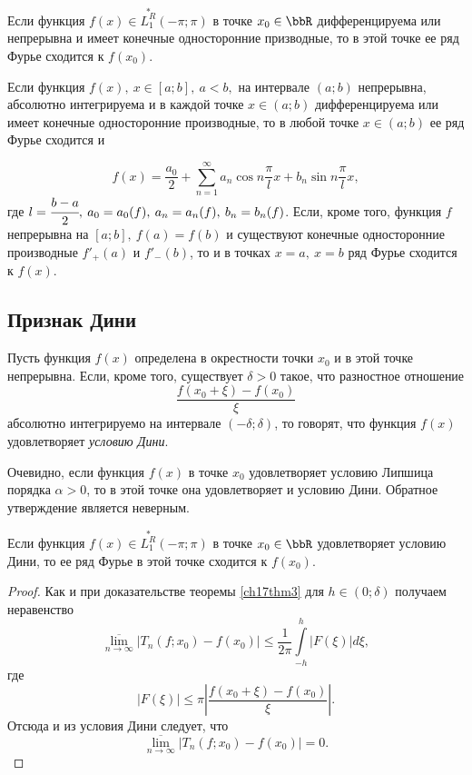 \begin{cons}
Если функция $f(x) \in \overset{*}{L^{R}_1}(-\pi;\pi)$ в точке $x_0 \in \bbR$ дифференцируема или непрерывна и имеет конечные односторонние призводные, то в этой точке ее ряд Фурье сходится к $f(x_0)$.
\end{cons}

\begin{cons}
Если функция $f(x), \: x \in [a;b], \: a < b,$ на интервале $(a;b)$ непрерывна, абсолютно интегрируема и в каждой точке $x \in (a;b)$ дифференцируема или имеет конечные односторонние производные, то в любой точке $x \in (a;b)$ ее ряд Фурье сходится и 

$$
f(x) = \frac{a_0}{2} + \sum\limits_{n = 1}^{\infty} a_n \cos{n \frac{\pi}{l} x} + b_n \sin{n \frac{\pi}{l} x},
$$
где $l = \cfrac{b - a}{2}, \: a_0 = a_0(f), \: a_n = a_n(f), \: b_n = b_n(f)$. Если, кроме того, функция $f$ непрерывна на $[a;b], \: f(a) = f(b)$ и существуют конечные односторонние производные $f'_+(a)$ и $f'_-(b)$, то и в точках $x = a, \: x = b$ ряд Фурье сходится к $f(x)$.
\end{cons}


\subsection{Признак Дини}
Пусть функция $f(x)$ определена в окрестности точки $x_0$ и в этой точке непрерывна. Если, кроме того, существует $\delta > 0$ такое, что разностное отношение
$$
\frac{f(x_0 + \xi) - f(x_0)}{\xi}
$$
абсолютно интегрируемо на интервале $(-\delta;\delta)$, то говорят, что функция $f(x)$ удовлетворяет \textit{условию Дини}.

Очевидно, если функция $f(x)$ в точке $x_0$ удовлетворяет условию Липшица порядка $\alpha > 0$, то в этой точке она удовлетворяет и условию Дини. Обратное утверждение является неверным.

\begin{thm}  \label{ch17thm4}
Если функция $f(x) \in \overset{*}{L^{R}_1}(-\pi;\pi)$ в точке $x_0 \in \bbR$ удовлетворяет условию Дини, то ее ряд Фурье в этой точке сходится к $f(x_0)$.
\end{thm}
\begin{proof}
Как и при доказательстве теоремы \ref{ch17thm3} для $h \in (0;\delta)$ получаем неравенство
$$
\overline{\lim\limits_{n \to \infty}}|T_n(f; x_0) - f(x_0)| \le \frac{1}{2\pi}\int\limits_{-h}^{h}|F(\xi)|d\xi,
$$
где
$$
|F(\xi)| \le \pi\left|\frac{f(x_0 + \xi) - f(x_0)}{\xi}\right|.
$$
Отсюда и из условия Дини следует, что
$$
\overline{\lim\limits_{n \to \infty}}|T_n(f; x_0) - f(x_0)| = 0.
$$
\end{proof}

